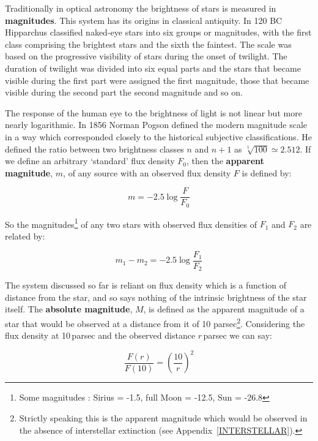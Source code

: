 \documentclass[twoside,11pt]{article}
\begin{document}
Traditionally in optical astronomy the brightness of stars is measured
in {\bf magnitudes}.  This system has its origins in classical
antiquity.  In 120 BC Hipparchus classified naked-eye stars into
six groups or magnitudes, with the first class comprising the brightest
stars and the sixth the faintest.  The scale was based on the
progressive visibility of stars during the onset of twilight.  The
duration of twilight was divided into six equal parts and the stars that
became visible during the first part were assigned the first magnitude,
those that became visible during the second part the second magnitude
and so on.

The response of the human eye to the brightness of light is not linear
but more nearly logarithmic. In 1856 Norman Pogson defined the modern
magnitude scale in a way which corresponded closely to the historical
subjective classifications.  He defined the ratio between two brightness
classes $n$ and $n+1$ as $\sqrt[5]{100} \simeq 2.512$.  If we define an
arbitrary `standard' flux density $F_0$, then the {\bf apparent
magnitude}, $m$, of any source with an observed flux density $F$ is
defined by:

\begin{equation}
m= -2.5 \log \frac{F}{F_0}
\end{equation}

So the magnitudes\footnote{Some magnitudes : Sirius = -1.5, full Moon
= -12.5, Sun = -26.8} of any two stars with observed flux densities of
$F_1$ and $F_2$ are related by:

\begin{equation}
m_1 - m_2 = -2.5 \log \frac{F_1}{F_2}
\end{equation}

The system discussed so far is reliant on flux density which is a
function of distance from the star, and so says nothing of the
intrinsic brightness of the star itself. The {\bf absolute magnitude},
$M$, is defined as the apparent magnitude of a star that would be
observed at a distance from it of 10 parsec\footnote{Strictly speaking
this is the apparent magnitude which would be observed in the absence
of interstellar extinction (see Appendix~\ref{INTERSTELLAR}).}. Considering
the flux density at 10\,parsec and the observed distance $r$\,parsec we
can say:

\begin{equation}
\frac{F(r)}{F(10)} = \left( \frac{10}{r} \right)^{2}
\end{equation} 
\end{document}
